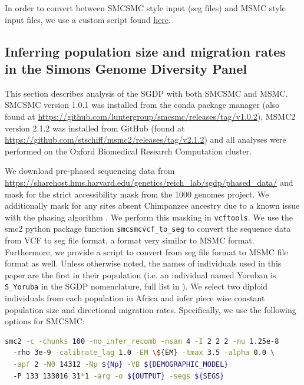 In order to convert between SMCSMC style input (seg files) and MSMC style input files, we use a custom script found \href{https://github.com/Chris1221/ancient_african_admixture/blob/master/pipelines/real_data/py/smc2-to-msmc.py}{here}.

\subsection{Inferring population size and migration rates in the Simons Genome Diversity Panel}

This section describes analysis of the SGDP with both SMCSMC and MSMC. SMCSMC version 1.0.1 was installed from the conda package manager (also found at \url{https://github.com/luntergroup/smcsmc/releases/tag/v1.0.2}), MSMC2 version 2.1.2 was installed from GitHub (found at \url{https://github.com/stschiff/msmc2/releases/tag/v2.1.2}) and all analyses were performed on the Oxford Biomedical Research Computation cluster. 

We download pre-phased sequencing data from \url{https://sharehost.hms.harvard.edu/genetics/reich_lab/sgdp/phased_data/} and mask for the strict accessibility mask from the 1000 genomes project. 
We additionally mask for any sites absent Chimpanzee ancestry due to a known issue with the phasing algorithm \cite{Wang2019a}. 
We perform this masking in {\tt vcftools}. We use the \gls{smc2} python package function {\tt smcsmc\.vcf\_to\_seg} to convert the sequence data from VCF to seg file format, a format very similar to MSMC format. 
Furthermore, we provide a script to convert from seg file format to MSMC file format as well. 
Unless otherwise noted, the names of individuals used in this paper are the first in their population (i.e. an individual named Yoruban is {\tt S\_Yoruba} in the SGDP nomenclature, full list in ).  
We select two diploid individuals from each population in Africa  and infer piece wise constant population size and directional migration rates. Specifically, we use the following options for SMCSMC:

\begin{lstlisting}[language=Bash]
smc2 -c -chunks 100 -no_infer_recomb -nsam 4 -I 2 2 2 -mu 1.25e-8 
  -rho 3e-9 -calibrate_lag 1.0 -EM \${EM} -tmax 3.5 -alpha 0.0 \
  -apf 2 -N0 14312 -Np ${Np} -VB ${DEMOGRAPHIC_MODEL} 
  -P 133 133016 31*1 -arg -o ${OUTPUT} -segs ${SEGS}
\end{lstlisting}

